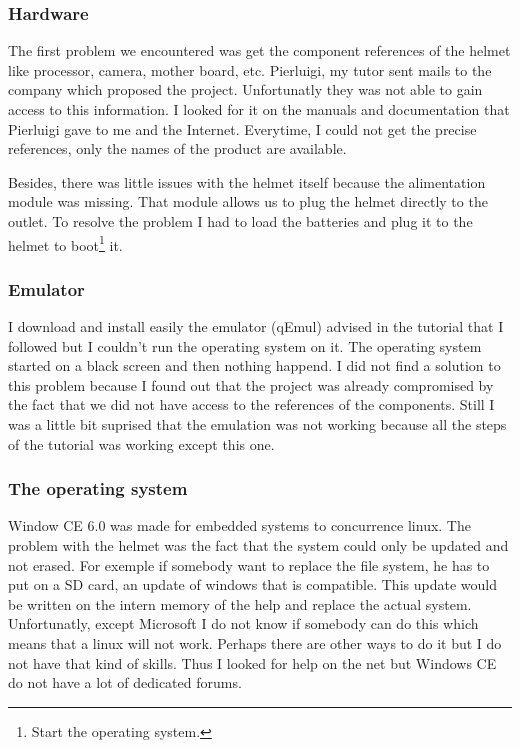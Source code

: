 	\subsubsection{Hardware}
	\par The first problem we encountered was get the component references of the helmet like processor, camera, mother board, etc. Pierluigi, my tutor sent mails to the company which proposed the project. Unfortunatly they was not able to gain access to this information. I looked for it on the manuals and documentation that Pierluigi gave to me and the Internet. Everytime, I could not get the precise references, only the names of the product are available.

	\par Besides, there was little issues with the helmet itself because the alimentation module was missing. That module allows us to plug the helmet directly to the outlet. To resolve the problem I had to load the batteries and plug it to the helmet to boot\footnote{Start the operating system.} it.

	\subsubsection{Emulator}
	
	\par I download and install easily the emulator (qEmul) advised in the tutorial that I followed but I couldn't run the operating system on  it. The operating system started on a black screen and then nothing happend. I did not find a solution to this problem because I found out that the project was already compromised by the fact that we did not have access to the references of the components. Still I was a little bit suprised that the emulation was not working because all the steps of the tutorial was working except this one.
	
	\subsubsection{The operating system}
	
	\par Window CE 6.0 was made for embedded systems to concurrence linux. The problem with the helmet was the fact that the system could only be updated and not erased. For exemple if somebody want to replace the file system, he has to put on a SD card, an update of windows that is compatible. This update would be written on the intern memory of the help and replace the actual system. Unfortunatly, except Microsoft I do not know if somebody can do this which means that a linux will not work. Perhaps there are other ways to do it but I do not have that kind of skills. Thus I looked for help on the net but Windows CE do not have a lot of dedicated forums.
	
